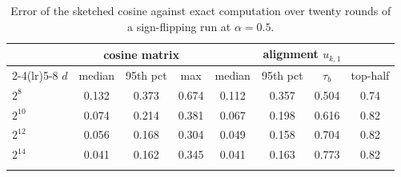 \begin{table}[!tbp]
\centering
\caption{Error of the sketched cosine against exact computation over twenty rounds of a sign-flipping run at $\alpha=0.5$.}
\label{tab:sketch}
\setlength{\tabcolsep}{4pt}
\footnotesize
\begin{tabular}{@{}lccccccc@{}}
\toprule
& \multicolumn{3}{c}{cosine matrix} & \multicolumn{4}{c}{alignment $u_{k,1}$}\\
\cmidrule(lr){2-4}\cmidrule(lr){5-8}
$d$ & median & 95th pct & max & median & 95th pct & $\tau_b$ & top-half\\
\midrule
$2^{8}$ & 0.132 & 0.373 & 0.674 & 0.112 & 0.357 & 0.504 & 0.74\\
$2^{10}$ & 0.074 & 0.214 & 0.381 & 0.067 & 0.198 & 0.616 & 0.82\\
$2^{12}$ & 0.056 & 0.168 & 0.304 & 0.049 & 0.158 & 0.704 & 0.82\\
$2^{14}$ & 0.041 & 0.162 & 0.345 & 0.041 & 0.163 & 0.773 & 0.82\\
\botrule
\end{tabular}
\end{table}

